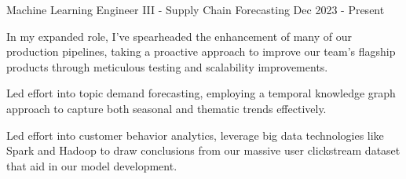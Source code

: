 \begin{cventries}
{\begin{cvitems}
    \end{cvitems}
    }
    {Machine Learning Engineer III - Supply Chain Forecasting}
    {Dec 2023 - Present}
    {
      \begin{cvitems} %
        \item {In my expanded role, I've spearheaded the enhancement of many of our production pipelines, taking a proactive approach to improve our team's flagship products through meticulous testing and scalability improvements.}
        \item {Led effort into topic demand forecasting, employing a temporal knowledge graph approach to capture both seasonal and thematic trends effectively.}
        \item {Led effort into customer behavior analytics, leverage big data technologies like Spark and Hadoop to draw conclusions from our massive user clickstream dataset that aid in our model development.}
      \end{cvitems}
    }

\end{cventries}
